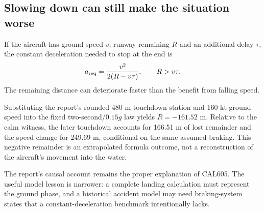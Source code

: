 \subsection*{Slowing down can still make the situation worse}
If the aircraft has ground speed $v$, runway remaining $R$ and an additional delay $\tau$, the constant deceleration needed to stop at the end is
\begin{equation}
a_{\rm req}=\frac{v^2}{2(R-v\tau)},\qquad R>v\tau.
\label{eq:required}
\end{equation}
The remaining distance can deteriorate faster than the benefit from falling speed.



Substituting the report's rounded 480 m touchdown station and 160 kt ground speed into the fixed two-second/$0.15g$ law yields $R=-161.52$ m. Relative to the calm witness, the later touchdown accounts for 166.51 m of lost remainder and the speed change for 249.69 m, conditional on the same assumed braking. This negative remainder is an extrapolated formula outcome, not a reconstruction of the aircraft's movement into the water.

The report's causal account remains the proper explanation of CAL605. The useful model lesson is narrower: a complete landing calculation must represent the ground phase, and a historical accident model may need braking-system states that a constant-deceleration benchmark intentionally lacks.
\clearpage
